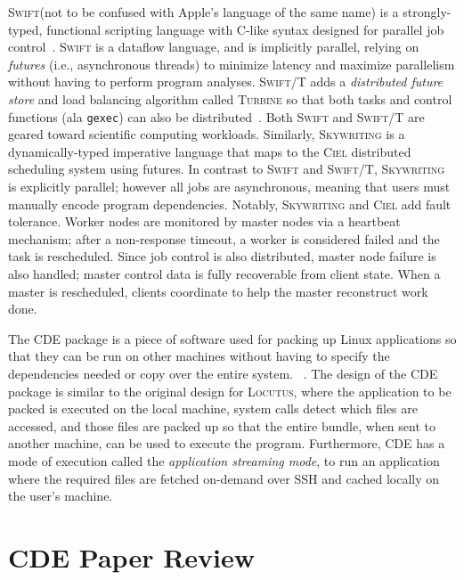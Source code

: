 \documentclass[11pt]{article}
\newcommand{\locutus}{\textsc{Locutus}\xspace}
\newcommand{\cde}{\textsc{CDE}\xspace}
\newcommand{\gexec}{\texttt{gexec}}
\newcommand{\swift}{\textsc{Swift}\xspace}
\newcommand{\swiftt}{\textsc{Swift/T}\xspace}
\newcommand{\turbine}{\textsc{Turbine}\xspace}
\newcommand{\ciel}{\textsc{Ciel}\xspace}
\newcommand{\skywriting}{\textsc{Skywriting}\xspace}
\begin{document}
\swift (not to be confused with Apple's language of the same name) is a strongly-typed, functional scripting language with C-like syntax designed for parallel job control~\cite{WILDE2011633}.  \swift is a dataflow language, and is implicitly parallel, relying on \emph{futures} (i.e., asynchronous threads) to minimize latency and maximize parallelism without having to perform program analyses.  \swiftt adds a \emph{distributed future store} and load balancing algorithm called \turbine so that both tasks and control functions (ala \gexec) can also be distributed~\cite{10.1145/2442516.2442559,6546066}.  Both \swift and \swiftt are geared toward scientific computing workloads.  Similarly, \skywriting is a dynamically-typed imperative language that maps to the \ciel distributed scheduling system using futures.  In contrast to \swift and \swiftt, \skywriting is explicitly parallel; however all jobs are asynchronous, meaning that users must manually encode program dependencies.  Notably, \skywriting and \ciel add fault tolerance.  Worker nodes are monitored by master nodes via a heartbeat mechanism; after a non-response timeout, a worker is considered failed and the task is rescheduled.  Since job control is also distributed, master node failure is also handled; master control data is fully recoverable from client state.  When a master is rescheduled, clients coordinate to help the master reconstruct work done.


The \cde package is a piece of software used for packing up Linux applications so that they can be run on other machines without having to specify the dependencies needed or copy over the entire system. ~\cite{10.1109/MCSE.2012.36, 10.5555/2002181.2002202}. The design of the \cde package is similar to the original design for \locutus, where the application to be packed is executed on the local machine, system calls detect which files are accessed, and those files are packed up so that the entire bundle, when sent to another machine, can be used to execute the program. Furthermore, \cde has a mode of execution called the \textit{application streaming mode}, to run an application where the required files are fetched on-demand over SSH and cached locally on the user's machine.

\section*{CDE Paper Review}
\end{document}
